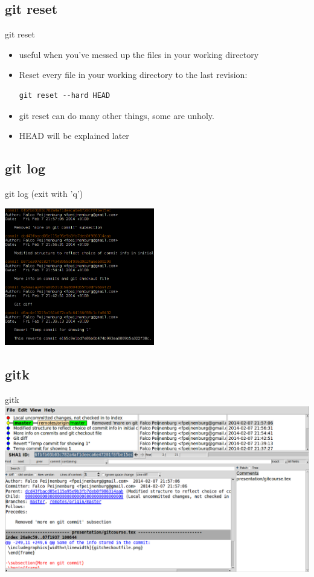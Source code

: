 \documentclass[10pt,a4paper]{beamer}
\begin{document}
\subsection{git reset}
\begin{frame}[fragile]{git reset}
\begin{itemize}
\item useful when you've messed up the files in your working directory
\item Reset every file in your working directory to the last revision:

\begin{verbatim}
git reset --hard HEAD
\end{verbatim}
\item git reset can do many other things, some are unholy.
\item HEAD will be explained later
\end{itemize}
\end{frame}

\subsection{git log}
\begin{frame}{git log (exit with 'q')}
\centerline{\includegraphics[height=6cm]{gitlog.png}}
\end{frame}

\subsection{gitk}
\begin{frame}{gitk}
\includegraphics[width=\linewidth]{gitk.png}
\end{frame}
\end{document}
